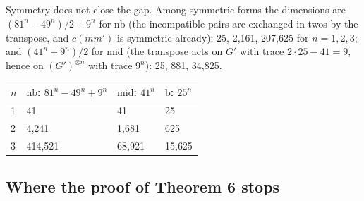 \documentclass[11pt,a4paper]{article}
\theoremstyle{definition}
\theoremstyle{remark}
\newcommand{\nb}{\mathrm{nb}}
\newcommand{\md}{\mathrm{mid}}
\newcommand{\br}{\mathrm{b}}
\begin{document}
Symmetry does not close the gap. Among symmetric forms the dimensions are $(81^n - 49^n)/2 + 9^n$ for $\nb$ (the incompatible pairs are exchanged in twos by the transpose, and $c(m m')$ is symmetric already): 25, 2{,}161, 207{,}625 for $n = 1, 2, 3$; and $(41^n + 9^n)/2$ for $\md$ (the transpose acts on $G'$ with trace $2 \cdot 25 - 41 = 9$, hence on $(G')^{\otimes n}$ with trace $9^n$): 25, 881, 34{,}825.

\begin{center}
\begin{tabular}{llll}
\toprule
$n$ & $\nb$: $81^n - 49^n + 9^n$ & $\md$: $41^n$ & $\br$: $25^n$ \\
\midrule
1 & 41 & 41 & 25 \\
2 & 4{,}241 & 1{,}681 & 625 \\
3 & 414{,}521 & 68{,}921 & 15{,}625 \\
\bottomrule
\end{tabular}
\end{center}

\subsection{Where the proof of Theorem 6 stops}
\end{document}
